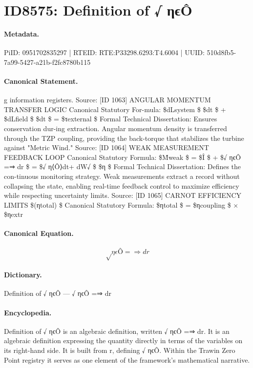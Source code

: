 \section*{ID8575: Definition of √ ηϵÔ}
\paragraph{Metadata.}
PiID: 0951702835297 | RTEID: RTE:P33298.6293:T4.6004 | UUID: 510d8fb5-7a99-5427-a21b-f2fc8780b115

\paragraph{Canonical Statement.}
g information registers. Source: [ID 1063] ANGULAR MOMENTUM TRANSFER LOGIC Canonical Statutory For-mula: \$dLsystem \$ \$dt \$ + \$dLfield \$ \$dt \$ = \$τexternal \$ Formal Technical Dissertation: Ensures conservation dur-ing extraction. Angular momentum density is transferred through the TZP coupling, providing the back-torque that stabilizes the turbine against "Metric Wind." Source: [ID 1064] WEAK MEASUREMENT FEEDBACK LOOP Canonical Statutory Formula: \$M̂weak \$ = \$Î \$ + \$√ ηϵÔ =⇒ dr \$ = \$√ η⟨Ô⟩dt+ dW√ \$ \$η \$ Formal Technical Dissertation: Defines the con-tinuous monitoring strategy. Weak measurements extract a record without collapsing the state, enabling real-time feedback control to maximize efficiency while respecting uncertainty limits. Source: [ID 1065] CARNOT EFFICIENCY LIMITS \$(ηtotal) \$ Canonical Statutory Formula: \$ηtotal \$ = \$ηcoupling \$ × \$ηextr

\paragraph{Canonical Equation.}
\[
√ ηϵÔ =⇒ dr
\]

\paragraph{Dictionary.}
Definition of √ ηϵÔ — √ ηϵÔ =⇒ dr

\paragraph{Encyclopedia.}
Definition of √ ηϵÔ is an algebraic definition, written √ ηϵÔ =⇒ dr. It is an algebraic definition expressing the quantity directly in terms of the variables on its right-hand side. It is built from r, defining √ ηϵÔ. Within the Trawin Zero Point registry it serves as one element of the framework's mathematical narrative.

